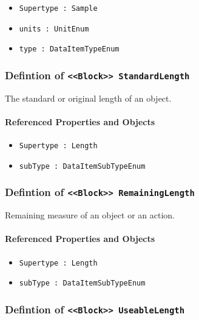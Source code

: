 \begin{itemize}
\item \texttt{Supertype : Sample}

\item \texttt{units : UnitEnum}

\item \texttt{type : DataItemTypeEnum}

\end{itemize}
\FloatBarrier
\subsubsection{Defintion of \texttt{<<Block>> StandardLength}}
  \label{type:StandardLength}

\FloatBarrier

The standard or original length of an object.

\FloatBarrier
\paragraph{Referenced Properties and Objects}

\begin{itemize}
\item \texttt{Supertype : Length}

\item \texttt{subType : DataItemSubTypeEnum}

\end{itemize}
\FloatBarrier
\subsubsection{Defintion of \texttt{<<Block>> RemainingLength}}
  \label{type:RemainingLength}

\FloatBarrier

Remaining measure of an object or an action.

\FloatBarrier
\paragraph{Referenced Properties and Objects}

\begin{itemize}
\item \texttt{Supertype : Length}

\item \texttt{subType : DataItemSubTypeEnum}

\end{itemize}
\FloatBarrier
\subsubsection{Defintion of \texttt{<<Block>> UseableLength}}
  \label{type:UseableLength}

